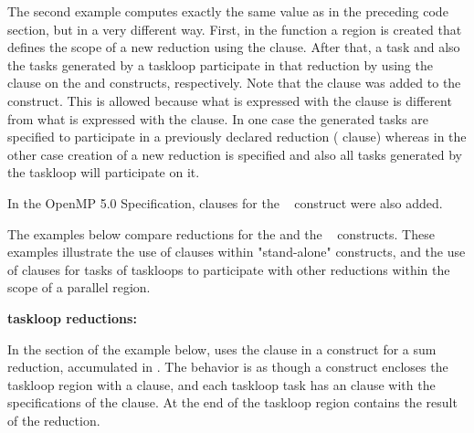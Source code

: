 The second example computes exactly the same value as in the preceding  code section,
but in a very different way.
First, in the  function a  region is created 
that defines the scope of a new reduction using the  clause.
After that, a task and also the tasks generated by a taskloop participate in 
that reduction by using the  clause on the 
and  constructs, respectively. 
Note that the  clause was added to the  construct.
This is allowed because what is expressed with the  clause
is different from what is expressed with the  clause.
In one case the generated tasks are specified to participate in a previously 
declared reduction ( clause) whereas in the other case
creation of a new reduction is specified and also all tasks generated 
by the taskloop will participate on it.


In the OpenMP 5.0 Specification,  clauses for the
~ construct were also added. 

The examples below compare reductions for the  and the ~ constructs.
These examples illustrate the use of  clauses within 
"stand-alone"  constructs, and the use of  clauses for tasks of taskloops to participate
with other reductions within the scope of a parallel region.

\textbf{taskloop reductions:}

In the  section of the example below, 
 uses the  clause 
in a  construct for a sum reduction, accumulated in . 
The behavior is as though a  construct encloses the 
taskloop region with a  clause, and each taskloop
task has an  clause with the specifications 
of the  clause.
At the end of the taskloop region  contains the result of the reduction.

